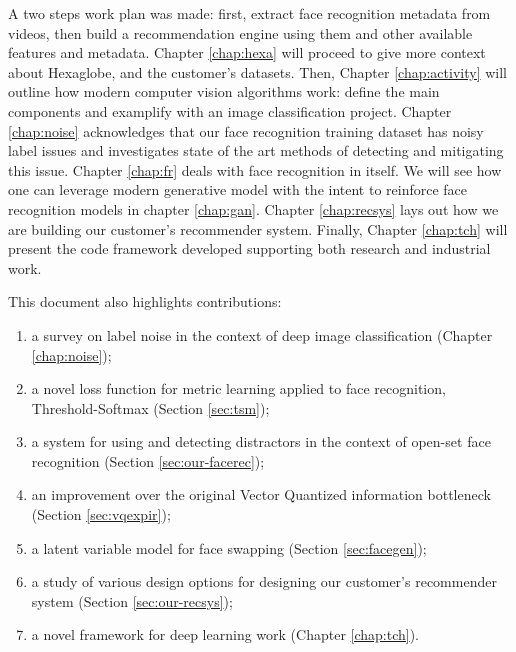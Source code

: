 A two steps work plan was made: first, extract face recognition metadata from videos, then build a recommendation engine using them and other available features and metadata. Chapter \ref{chap:hexa} will proceed to give more context about Hexaglobe, and the customer's datasets. Then, Chapter \ref{chap:activity} will outline how modern computer vision algorithms work: define the main components and examplify with an image classification project. Chapter \ref{chap:noise} acknowledges that our face recognition training dataset has noisy label issues and investigates state of the art methods of detecting and mitigating this issue. Chapter \ref{chap:fr} deals with face recognition in itself. We will see how one can leverage modern generative model with the intent to reinforce face recognition models in chapter \ref{chap:gan}. Chapter \ref{chap:recsys} lays out how we are building our customer's recommender system. Finally, Chapter \ref{chap:tch} will present the code framework developed supporting both research and industrial work.

This document also highlights contributions:

\begin{enumerate}
    \item a survey on label noise in the context of deep image classification (Chapter \ref{chap:noise});
    \item a novel loss function for metric learning applied to face recognition, Threshold-Softmax (Section \ref{sec:tsm});
    \item a system for using and detecting distractors in the context of open-set face recognition (Section \ref{sec:our-facerec});
    \item an improvement over the original Vector Quantized information bottleneck (Section \ref{sec:vqexpir});
    \item a latent variable model for face swapping (Section \ref{sec:facegen});
    \item a study of various design options for designing our customer's recommender system (Section \ref{sec:our-recsys});
    \item a novel framework for deep learning work (Chapter \ref{chap:tch}).
\end{enumerate}
